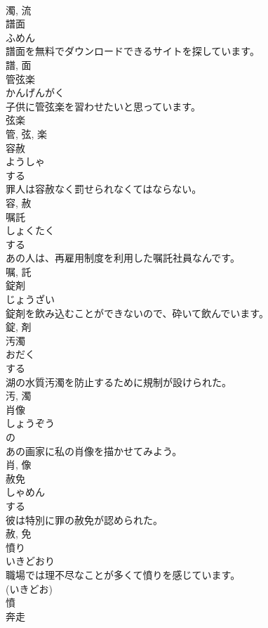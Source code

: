 \documentclass[8pt]{extreport}
\begin{document}
\begin{CJK}{UTF8}{min}
\\	濁, 流	
\\	譜面	
\\	ふめん	
\\	譜面を無料でダウンロードできるサイトを探しています。	
\\	譜, 面	
\\	管弦楽	
\\	かんげんがく	
\\	子供に管弦楽を習わせたいと思っています。	
\\	弦楽 
\\	管, 弦, 楽	
\\	容赦	
\\	ようしゃ	
\\	する 
\\	罪人は容赦なく罰せられなくてはならない。	
\\	容, 赦	
\\	嘱託	
\\	しょくたく	
\\	する 
\\	あの人は、再雇用制度を利用した嘱託社員なんです。	
\\	嘱, 託	
\\	錠剤	
\\	じょうざい	
\\	錠剤を飲み込むことができないので、砕いて飲んでいます。	
\\	錠, 剤	
\\	汚濁	
\\	おだく	
\\	する 
\\	湖の水質汚濁を防止するために規制が設けられた。	
\\	汚, 濁	
\\	肖像	
\\	しょうぞう	
\\	の 
\\	あの画家に私の肖像を描かせてみよう。	
\\	肖, 像	
\\	赦免	
\\	しゃめん	
\\	する 
\\	彼は特別に罪の赦免が認められた。	
\\	赦, 免	
\\	憤り	
\\	いきどおり	
\\	職場では理不尽なことが多くて憤りを感じています。	
\\	(いきどお) 
\\	憤	
\\	奔走	

\end{CJK}
\end{document}

